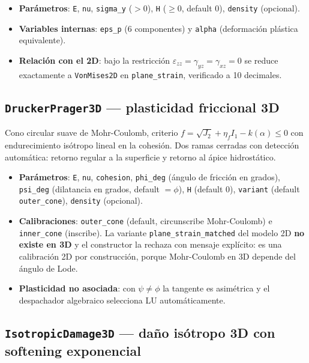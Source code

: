 \documentclass[11pt,oneside]{report}
\begin{document}
\begin{itemize}
  \item \textbf{Parámetros}: \texttt{E}, \texttt{nu}, \texttt{sigma\_y} ($>0$), \texttt{H} ($\ge 0$, default 0), \texttt{density} (opcional).
  \item \textbf{Variables internas}: \texttt{eps\_p} (6 componentes) y \texttt{alpha} (deformación plástica equivalente).
  \item \textbf{Relación con el 2D}: bajo la restricción $\varepsilon_{zz} = \gamma_{yz} = \gamma_{xz} = 0$ se reduce exactamente a \texttt{VonMises2D} en \texttt{plane\_strain}, verificado a 10 decimales.
\end{itemize}

\subsection{\texttt{DruckerPrager3D} --- plasticidad friccional 3D}

Cono circular suave de Mohr-Coulomb, criterio $f = \sqrt{J_2} + \eta_f I_1 - k(\alpha) \le 0$ con endurecimiento isótropo lineal en la cohesión. Dos ramas cerradas con detección automática: retorno regular a la superficie y retorno al ápice hidrostático.

\begin{itemize}
  \item \textbf{Parámetros}: \texttt{E}, \texttt{nu}, \texttt{cohesion}, \texttt{phi\_deg} (ángulo de fricción en grados), \texttt{psi\_deg} (dilatancia en grados, default $=\phi$), \texttt{H} (default 0), \texttt{variant} (default \texttt{outer\_cone}), \texttt{density} (opcional).
  \item \textbf{Calibraciones}: \texttt{outer\_cone} (default, circunscribe Mohr-Coulomb) e \texttt{inner\_cone} (inscribe). La variante \texttt{plane\_\allowbreak{}strain\_\allowbreak{}matched} del modelo 2D \textbf{no existe en 3D} y el constructor la rechaza con mensaje explícito: es una calibración 2D por construcción, porque Mohr-Coulomb en 3D depende del ángulo de Lode.
  \item \textbf{Plasticidad no asociada}: con $\psi \neq \phi$ la tangente es asimétrica y el despachador algebraico selecciona LU automáticamente.
\end{itemize}

\subsection{\texttt{IsotropicDamage3D} --- daño isótropo 3D con softening exponencial}
\end{document}
